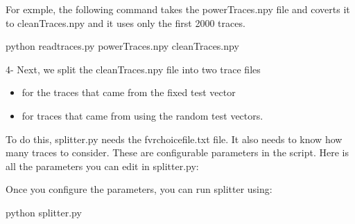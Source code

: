 \documentclass[letterpaper,10pt,english]{sphinxmanual}
\begin{document}
For exmple, the following command takes the powerTraces.npy file and coverts it to cleanTraces.npy and it uses only the
first 2000 traces.

\begin{sphinxVerbatim}[commandchars=\\\{\}]
python read\PYGZus{}traces.py powerTraces.npy cleanTraces.npy 
\end{sphinxVerbatim}

4-  Next, we split the cleanTraces.npy file into two trace files
\begin{itemize}
\item {} 
 for the traces that came from the fixed test vector

\item {} 
 for traces that came from using the random test vectors.

\end{itemize}

To do this, splitter.py needs the fvrchoicefile.txt file. It also needs to know how many traces to consider.
These are configurable parameters in the script. Here is all the parameters you can edit in splitter.py:

\begin{sphinxVerbatim}[commandchars=\\\{\}]
  
  
  
  
\end{sphinxVerbatim}

Once you configure the parameters, you can run splitter using:

\begin{sphinxVerbatim}[commandchars=\\\{\}]
python splitter.py
\end{sphinxVerbatim}
\end{document}
